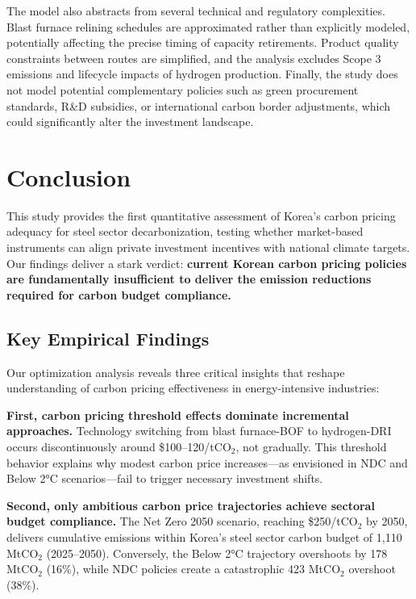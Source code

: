 \documentclass[preprint,5p,authoryear]{elsarticle}
\begin{document}
The model also abstracts from several technical and regulatory complexities. Blast furnace relining schedules are approximated rather than explicitly modeled, potentially affecting the precise timing of capacity retirements. Product quality constraints between routes are simplified, and the analysis excludes Scope 3 emissions and lifecycle impacts of hydrogen production. Finally, the study does not model potential complementary policies such as green procurement standards, R\&D subsidies, or international carbon border adjustments, which could significantly alter the investment landscape.

\section{Conclusion}

This study provides the first quantitative assessment of Korea's carbon pricing adequacy for steel sector decarbonization, testing whether market-based instruments can align private investment incentives with national climate targets. Our findings deliver a stark verdict: \textbf{current Korean carbon pricing policies are fundamentally insufficient to deliver the emission reductions required for carbon budget compliance.}

\subsection{Key Empirical Findings}

Our optimization analysis reveals three critical insights that reshape understanding of carbon pricing effectiveness in energy-intensive industries:

\textbf{First, carbon pricing threshold effects dominate incremental approaches.} Technology switching from blast furnace-BOF to hydrogen-DRI occurs discontinuously around \$100--120/tCO$_2$, not gradually. This threshold behavior explains why modest carbon price increases—as envisioned in NDC and Below 2°C scenarios—fail to trigger necessary investment shifts.

\textbf{Second, only ambitious carbon price trajectories achieve sectoral budget compliance.} The Net Zero 2050 scenario, reaching \$250/tCO$_2$ by 2050, delivers cumulative emissions within Korea's steel sector carbon budget of 1,110 MtCO$_2$ (2025--2050). Conversely, the Below 2°C trajectory overshoots by 178 MtCO$_2$ (16\%), while NDC policies create a catastrophic 423 MtCO$_2$ overshoot (38\%).
\end{document}
